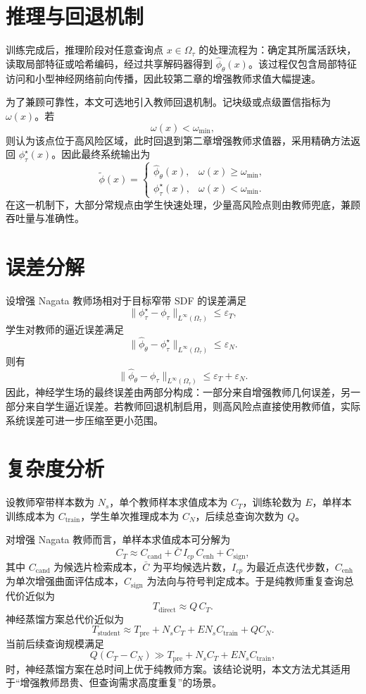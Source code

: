 \documentclass[12pt,oneside]{ctexbook}
\begin{document}
\section{推理与回退机制}
训练完成后，推理阶段对任意查询点 $x\in\Omega_\tau$ 的处理流程为：确定其所属活跃块，读取局部特征或哈希编码，经过共享解码器得到 $\hat\phi_\theta(x)$。该过程仅包含局部特征访问和小型神经网络前向传播，因此较第二章的增强教师求值大幅提速。

为了兼顾可靠性，本文可选地引入教师回退机制。记块级或点级置信指标为 $\omega(x)$。若
\[
\omega(x)<\omega_{\min},
\]
则认为该点位于高风险区域，此时回退到第二章增强教师求值器，采用精确方法返回 $\phi^\star_\tau(x)$。因此最终系统输出为
\[
\tilde\phi(x)=
\begin{cases}
\hat\phi_\theta(x), & \omega(x)\ge \omega_{\min},\\
\phi^\star_\tau(x), & \omega(x)<\omega_{\min}.
\end{cases}
\]
在这一机制下，大部分常规点由学生快速处理，少量高风险点则由教师兜底，兼顾吞吐量与准确性。

\section{误差分解}
设增强 Nagata 教师场相对于目标窄带 SDF 的误差满足
\[
\|\phi^\star_\tau-\phi_\tau\|_{L^\infty(\Omega_\tau)}\le \varepsilon_T,
\]
学生对教师的逼近误差满足
\[
\|\hat\phi_\theta-\phi^\star_\tau\|_{L^\infty(\Omega_\tau)}\le \varepsilon_N.
\]
则有
\[
\|\hat\phi_\theta-\phi_\tau\|_{L^\infty(\Omega_\tau)}
\le
\varepsilon_T+\varepsilon_N.
\]
因此，神经学生场的最终误差由两部分构成：一部分来自增强教师几何误差，另一部分来自学生逼近误差。若教师回退机制启用，则高风险点直接使用教师值，实际系统误差可进一步压缩至更小范围。

\section{复杂度分析}
设教师窄带样本数为 $N_s$，单个教师样本求值成本为 $C_T$，训练轮数为 $E$，单样本训练成本为 $C_{\mathrm{train}}$，学生单次推理成本为 $C_N$，后续总查询次数为 $Q$。

对增强 Nagata 教师而言，单样本求值成本可分解为
\[
C_T\approx C_{\mathrm{cand}}+\bar C\,I_{cp}\,C_{\mathrm{enh}}+C_{\mathrm{sign}},
\]
其中 $C_{\mathrm{cand}}$ 为候选片检索成本，$\bar C$ 为平均候选片数，$I_{cp}$ 为最近点迭代步数，$C_{\mathrm{enh}}$ 为单次增强曲面评估成本，$C_{\mathrm{sign}}$ 为法向与符号判定成本。于是纯教师重复查询总代价近似为
\[
T_{\mathrm{direct}}\approx Q\,C_T.
\]
神经蒸馏方案总代价近似为
\[
T_{\mathrm{student}}\approx T_{\mathrm{pre}}+N_s C_T + E N_s C_{\mathrm{train}} + Q C_N.
\]
当前后续查询规模满足
\[
Q(C_T-C_N)\gg T_{\mathrm{pre}}+N_s C_T + E N_s C_{\mathrm{train}},
\]
时，神经蒸馏方案在总时间上优于纯教师方案。该结论说明，本文方法尤其适用于“增强教师昂贵、但查询需求高度重复”的场景。
\end{document}
